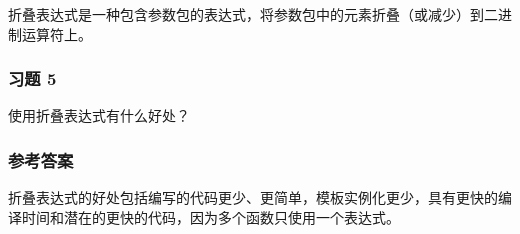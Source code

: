 折叠表达式是一种包含参数包的表达式，将参数包中的元素折叠（或减少）到二进制运算符上。

\subsubsection{习题 5}

使用折叠表达式有什么好处？

\subsubsection{参考答案}

折叠表达式的好处包括编写的代码更少、更简单，模板实例化更少，具有更快的编译时间和潜在的更快的代码，因为多个函数只使用一个表达式。













